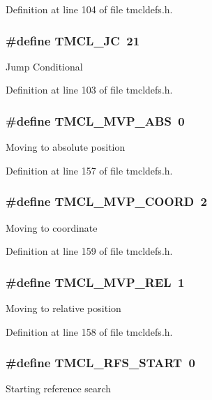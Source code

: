 Definition at line 104 of file tmcldefs.h.\hypertarget{group__TMCLComm_gae98b22b798475ff3262efec2168b98a1}{
\subsubsection[{TMCL\_\-JC}]{\setlength{\rightskip}{0pt plus 5cm}\#define TMCL\_\-JC~21}}
\label{group__TMCLComm_gae98b22b798475ff3262efec2168b98a1}
Jump Conditional 

Definition at line 103 of file tmcldefs.h.\hypertarget{group__TMCLComm_gafb1f96d5d46a081eaafdf4d8172e5417}{
\subsubsection[{TMCL\_\-MVP\_\-ABS}]{\setlength{\rightskip}{0pt plus 5cm}\#define TMCL\_\-MVP\_\-ABS~0}}
\label{group__TMCLComm_gafb1f96d5d46a081eaafdf4d8172e5417}
Moving to absolute position 

Definition at line 157 of file tmcldefs.h.\hypertarget{group__TMCLComm_gab1bd55bf2087a0fa580a7ed196b731b2}{
\subsubsection[{TMCL\_\-MVP\_\-COORD}]{\setlength{\rightskip}{0pt plus 5cm}\#define TMCL\_\-MVP\_\-COORD~2}}
\label{group__TMCLComm_gab1bd55bf2087a0fa580a7ed196b731b2}
Moving to coordinate 

Definition at line 159 of file tmcldefs.h.\hypertarget{group__TMCLComm_gabb48ea6fc019299ba3081da7be7a1cdb}{
\subsubsection[{TMCL\_\-MVP\_\-REL}]{\setlength{\rightskip}{0pt plus 5cm}\#define TMCL\_\-MVP\_\-REL~1}}
\label{group__TMCLComm_gabb48ea6fc019299ba3081da7be7a1cdb}
Moving to relative position 

Definition at line 158 of file tmcldefs.h.\hypertarget{group__TMCLComm_ga8ecbfcad4ab934cc6b3b4c90f07a5ba6}{
\subsubsection[{TMCL\_\-RFS\_\-START}]{\setlength{\rightskip}{0pt plus 5cm}\#define TMCL\_\-RFS\_\-START~0}}
\label{group__TMCLComm_ga8ecbfcad4ab934cc6b3b4c90f07a5ba6}
Starting reference search 

